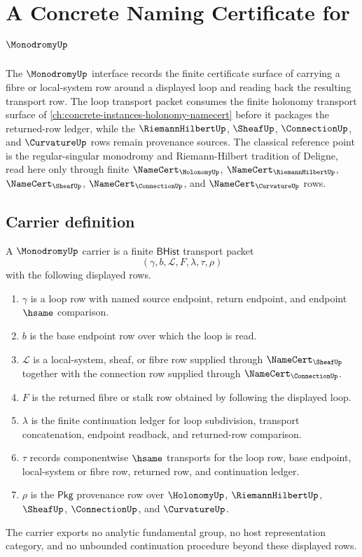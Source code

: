 \chapter{A Concrete Naming Certificate for $\MonodromyUp$}
\label{ch:concrete-instances-monodromy-namecert}

The $\MonodromyUp$ interface records the finite certificate surface of carrying a fibre or local-system row around a displayed loop and reading back the resulting transport row. The loop transport packet consumes the finite holonomy transport surface of \autoref{ch:concrete-instances-holonomy-namecert} before it packages the returned-row ledger, while the $\RiemannHilbertUp$, $\SheafUp$, $\ConnectionUp$, and $\CurvatureUp$ rows remain provenance sources. The classical reference point is the regular-singular monodromy and Riemann-Hilbert tradition of Deligne, read here only through finite $\NameCert_{\HolonomyUp}$, $\NameCert_{\RiemannHilbertUp}$, $\NameCert_{\SheafUp}$, $\NameCert_{\ConnectionUp}$, and $\NameCert_{\CurvatureUp}$ rows.

\section{Carrier definition}
\label{sec:monodromy-carrier}

\begin{definition}
\label{def:monodromy-bhist-transport-carrier}
A $\MonodromyUp$ carrier is a finite $\mathsf{BHist}$ transport packet
$$
(\gamma,b,\mathcal L,F,\lambda,\tau,\rho)
$$
with the following displayed rows.
\begin{enumerate}
\item $\gamma$ is a loop row with named source endpoint, return endpoint, and endpoint $\hsame$ comparison.
\item $b$ is the base endpoint row over which the loop is read.
\item $\mathcal L$ is a local-system, sheaf, or fibre row supplied through $\NameCert_{\SheafUp}$ together with the connection row supplied through $\NameCert_{\ConnectionUp}$.
\item $F$ is the returned fibre or stalk row obtained by following the displayed loop.
\item $\lambda$ is the finite continuation ledger for loop subdivision, transport concatenation, endpoint readback, and returned-row comparison.
\item $\tau$ records componentwise $\hsame$ transports for the loop row, base endpoint, local-system or fibre row, returned row, and continuation ledger.
\item $\rho$ is the $\mathsf{Pkg}$ provenance row over $\HolonomyUp$, $\RiemannHilbertUp$, $\SheafUp$, $\ConnectionUp$, and $\CurvatureUp$.
\end{enumerate}
The carrier exports no analytic fundamental group, no host representation category, and no unbounded continuation procedure beyond these displayed rows.
\end{definition}

